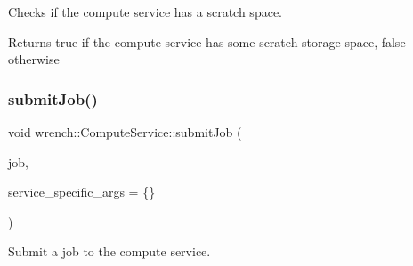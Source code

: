 Checks if the compute service has a scratch space. 

\begin{DoxyReturn}{Returns}
true if the compute service has some scratch storage space, false otherwise 
\end{DoxyReturn}
\mbox{\label{classwrench_1_1_compute_service_abc9e51234c29965341727f07b446ff0c}} 
\subsubsection{\texorpdfstring{submit\+Job()}{submitJob()}}
{\footnotesize\ttfamily void wrench\+::\+Compute\+Service\+::submit\+Job (\begin{DoxyParamCaption}\item[{\hyperlink{classwrench_1_1_workflow_job}{Workflow\+Job} $\ast$}]{job,  }\item[{std\+::map$<$ std\+::string, std\+::string $>$}]{service\+\_\+specific\+\_\+args = {\ttfamily \{\}} }\end{DoxyParamCaption})}



Submit a job to the compute service. 


